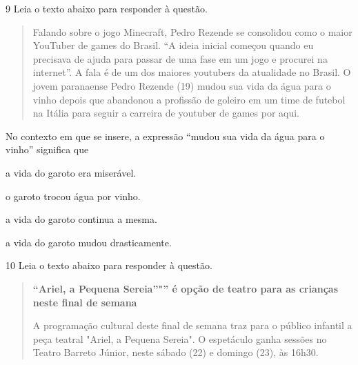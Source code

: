 \num{9} Leia o texto abaixo para responder à questão. 

\begin{quote}

Falando sobre o jogo Minecraft, Pedro Rezende se consolidou como o
maior YouTuber de games do Brasil. ``A ideia inicial começou quando eu
precisava de ajuda para passar de uma fase em um jogo e procurei na
internet''. A fala é de um dos maiores youtubers da atualidade no Brasil. O jovem
paranaense Pedro Rezende (19) mudou sua vida da água para o vinho depois
que abandonou a profissão de goleiro em um time de futebol na Itália
para seguir a carreira de youtuber de games por aqui.

\end{quote}


No contexto em que se insere, a expressão ``mudou sua vida da água para o vinho''
significa que 

\begin{escolha}

    \item a vida do garoto era miserável.

    \item o garoto trocou água por vinho.

    \item a vida do garoto continua a mesma.

    \item a vida do garoto mudou drasticamente.

\end{escolha}

\num{10} Leia o texto abaixo para responder à questão.

\begin{quote}

\centering\textbf{``Ariel, a Pequena Sereia''"'' é opção de teatro para as crianças neste 
final de semana}

A programação cultural deste final de semana traz para o público infantil 
a peça teatral "Ariel, a Pequena Sereia". O espetáculo ganha sessões no Teatro 
Barreto Júnior, neste sábado (22) e domingo (23), às 16h30.

\end{quote}

